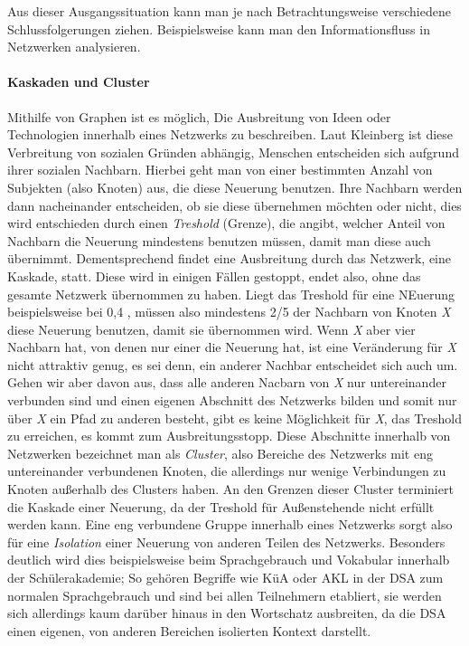 Aus dieser Ausgangssituation kann man je nach Betrachtungsweise verschiedene Schlussfolgerungen ziehen.
Beispielsweise kann man den Informationsfluss in Netzwerken analysieren.

\paragraph{Kaskaden und Cluster}

Mithilfe von Graphen ist es möglich, Die Ausbreitung von Ideen oder Technologien innerhalb eines Netzwerks zu beschreiben.
Laut Kleinberg ist diese Verbreitung von sozialen Gründen abhängig, Menschen entscheiden sich aufgrund ihrer sozialen Nachbarn.
Hierbei geht man von einer bestimmten Anzahl von Subjekten (also Knoten) aus, die diese Neuerung benutzen.
Ihre Nachbarn werden dann nacheinander entscheiden, ob sie diese übernehmen möchten oder nicht, dies wird entschieden durch einen \emph{Treshold} (Grenze), die angibt, welcher Anteil von Nachbarn die Neuerung mindestens benutzen müssen, damit man diese auch übernimmt.
Dementsprechend findet eine Ausbreitung durch das Netzwerk, eine Kaskade, statt.
Diese wird in einigen Fällen gestoppt, endet also, ohne das gesamte Netzwerk übernommen zu haben.
Liegt das Treshold für eine NEuerung beispielsweise bei 0,4 , müssen also mindestens 2/5 der Nachbarn von Knoten \emph{X} diese Neuerung benutzen, damit sie übernommen wird.
Wenn \emph{X} aber vier Nachbarn hat, von denen nur einer die Neuerung hat, ist eine Veränderung für \emph{X} nicht attraktiv genug, es sei denn, ein anderer Nachbar entscheidet sich auch um.
Gehen wir aber davon aus, dass alle anderen Nacbarn von \emph{X} nur untereinander verbunden sind und einen eigenen Abschnitt des Netzwerks bilden und somit nur über \emph{X} ein Pfad zu anderen besteht, gibt es keine Möglichkeit für \emph{X}, das Treshold zu erreichen, es kommt zum Ausbreitungsstopp.
Diese Abschnitte innerhalb von Netzwerken bezeichnet man als \emph{Cluster}, also Bereiche des Netzwerks mit eng untereinander verbundenen Knoten, die allerdings nur wenige Verbindungen zu Knoten außerhalb des Clusters haben.
An den Grenzen dieser Cluster terminiert die Kaskade einer Neuerung, da der Treshold für Außenstehende nicht erfüllt werden kann.
Eine eng verbundene Gruppe innerhalb eines Netzwerks sorgt also für eine \emph{Isolation} einer Neuerung von anderen Teilen des Netzwerks.
Besonders deutlich wird dies beispielsweise beim Sprachgebrauch und Vokabular innerhalb der Schülerakademie;
So gehören Begriffe wie KüA oder AKL in der DSA zum normalen Sprachgebrauch und sind bei allen Teilnehmern etabliert, sie werden sich allerdings kaum darüber hinaus in den Wortschatz ausbreiten, da die DSA einen eigenen, von anderen Bereichen isolierten Kontext darstellt.
